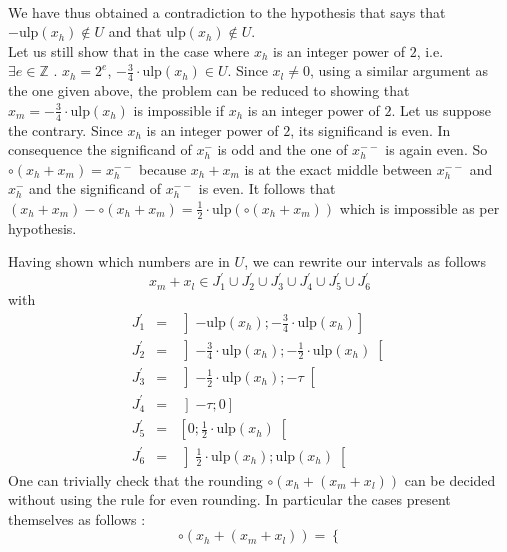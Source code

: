 \documentclass[a4paper,10pt,twoside]{article}
\newenvironment{proof}[1][Proof]{\begin{trivlist}
\item[\hskip \labelsep {\bfseries #1}]}{\end{trivlist}}
\newcommand{\Z}{\ensuremath{\mathbb {Z}}}
\newcommand{\hi}{\ensuremath{\mathit{h}}}
\newcommand{\mi}{\ensuremath{\mathit{m}}}
\newcommand{\lo}{\ensuremath{\mathit{l}}}
\newcommand{\mUlp}{\ensuremath{\mathrm{ulp}}}
\begin{document}
\begin{proof}
\begin{eqnarray*}
\end{eqnarray*}
We have thus obtained a contradiction to the hypothesis that says that 
$-\mUlp\left( x_\hi \right) \not \in U$ and that $\mUlp\left( x_\hi \right) \not \in U$. \\
Let us still show that in the case where $x_\hi$ is an integer power of $2$, i.e. 
$\exists e \in \Z \mbox{ . } x_\hi = 2^e$, $-\frac{3}{4} \cdot \mUlp\left( x_\hi \right) \in U$.
Since $x_\lo \not = 0$, using a similar argument as the one given above, the problem can be reduced to showing
that $x_\mi = - \frac{3}{4} \cdot \mUlp \left( x_\hi \right)$ is impossible if $x_\hi$ is an integer power of $2$.
Let us suppose the contrary. Since $x_\hi$ is an integer power of $2$, its significand is even. In consequence 
the significand of $x_\hi^-$ is odd and the one of $x_\hi^{--}$ is again even. So 
$\circ\left( x_\hi + x_\mi \right) = x_\hi^{--}$ because $x_\hi + x_\mi$ is at the exact middle between
$x_\hi^{--}$ and $x_\hi^{-}$ and the significand of $x_\hi^{--}$ is even. It follows that 
$\left( x_\hi + x_\mi \right) - \circ\left( x_\hi + x_\mi \right) = 
\frac{1}{2} \cdot \mUlp \left( \circ\left( x_\hi + x_\mi \right) \right)$ which is impossible as per hypothesis. \par
Having shown which numbers are in $U$, we can rewrite our intervals as follows
$$x_\mi + x_\lo \in J^\prime_1 \cup J^\prime_2 \cup J^\prime_3 \cup J^\prime_4 \cup J^\prime_5 \cup J^\prime_6$$
with
\begin{eqnarray*}
J^\prime_1 & = & \left] - \mUlp\left( x_\hi \right) ; - \frac{3}{4} \cdot \mUlp\left( x_\hi \right) \right] \\
J^\prime_2 & = & \left] - \frac{3}{4} \cdot \mUlp\left( x_\hi \right) ; 
- \frac{1}{2} \cdot \mUlp\left( x_\hi \right) \right[ \\
J^\prime_3 & = & \left] - \frac{1}{2} \cdot \mUlp\left( x_\hi \right) ; - \tau \right[ \\
J^\prime_4 & = & \left] - \tau ; 0 \right] \\
J^\prime_5 & = & \left[ 0 ; \frac{1}{2} \cdot \mUlp\left( x_\hi \right) \right[ \\
J^\prime_6 & = & \left] \frac{1}{2} \cdot \mUlp\left( x_\hi \right) ; \mUlp\left( x_\hi \right) \right[
\end{eqnarray*}
One can trivially check that the rounding $\circ \left( x_\hi + \left( x_\mi + x_\lo \right) \right)$ can be decided without
using the rule for even rounding.
In particular the cases present themselves as follows \cite{IEEE754}:
$$\circ \left( x_\hi + \left( x_\mi + x_\lo\right) \right) = \left \lbrace
$$
\end{proof}
\end{document}
